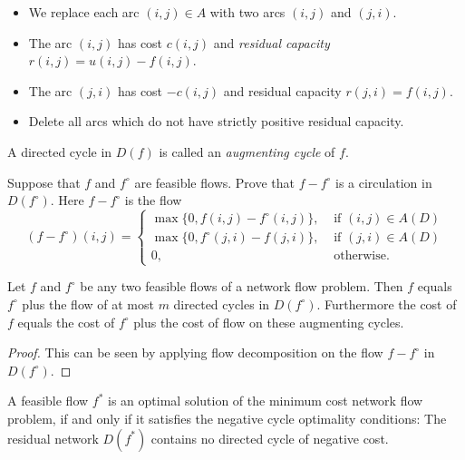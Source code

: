   \begin{itemize}
  \item We replace each arc $(i,j) \in A$ with two arcs $(i,j)$ and
    $(j,i)$.
  \item The arc $(i,j)$ has cost $c{(i,j)}$ and \emph{residual capacity}
    $r{(i,j)} = u{(i,j)} - f{(i,j)}$.  
  \item The arc $(j,i)$    has cost $-c{(i,j)}$ and
    residual capacity $r{(j,i)}=f{(i,j)}$. 
  \item      Delete all arcs which do not have strictly positive residual
    capacity. 
  \end{itemize}

  
  A directed cycle in $D(f)$ is called an \emph{augmenting cycle} of
  $f$.  

 
  \begin{exercise}
    Suppose that $f$ and $f^\circ$ are feasible flows. 
    Prove that $f  - f^\circ$  is a circulation in $D(f^\circ)$.  Here $f  -
    f^\circ$ is the flow  
    \begin{displaymath}
      (f-f^\circ)(i,j) = 
      \begin{cases}
        \max\{0, f(i,j) - f^\circ(i,j)\}, & \text{ if } (i,j) \in  A(D)\\
        \max\{0, f^\circ(j,i) - f(j,i)\}, & \text{ if } (j,i) \in  A(D)\\
        0, & \text{ otherwise.}
      \end{cases}
    \end{displaymath}
  \end{exercise}
   
  


  \begin{theorem}
    \label{thr:augcyc}
    Let $f$ and $f^\circ$ be any two feasible flows of a network flow
    problem. Then $f$ equals $f^\circ$ plus the flow of at most $m$
    directed cycles in $D(f^\circ)$.  Furthermore the cost of $f$ equals
    the cost of $f^\circ$ plus the cost of flow on these augmenting
    cycles. 
  \end{theorem}
  
  \begin{proof}
    This can be seen by applying flow decomposition on the  flow 
    $f - f^\circ$  in $D(f^\circ)$. 
  \end{proof}
  

 
  
  \begin{theorem}
    \label{thr:13}
    A feasible flow $f^*$ is an optimal solution of the minimum cost
    network flow problem, if and only if it satisfies the negative
    cycle optimality conditions: The residual network $D(f^*)$
    contains no directed cycle of negative cost.    
  \end{theorem}


